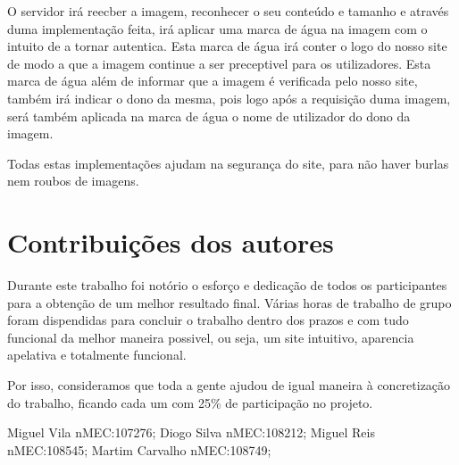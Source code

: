 \documentclass{report}
\begin{document}
O servidor irá reecber a imagem, reconhecer o seu conteúdo e tamanho e através duma implementação feita, irá aplicar uma marca de água na imagem com o intuito de a tornar autentica. Esta marca de água irá conter o logo do nosso site de modo a que a imagem continue a ser preceptivel para os utilizadores.
Esta marca de água além de informar que a imagem é verificada pelo nosso site, também irá indicar o dono da mesma, pois logo após a requisição duma imagem, será também aplicada na marca de água o nome de utilizador do dono da imagem.

Todas estas implementações ajudam na segurança do site, para não haver burlas nem roubos de imagens.



\section{Contribuições dos autores}
Durante este trabalho foi notório o esforço e dedicação de todos os participantes para a obtenção de um melhor resultado final. Várias horas de trabalho de grupo foram dispendidas para concluir o trabalho dentro dos prazos e com tudo funcional da melhor maneira possivel, ou seja, um site intuitivo, aparencia apelativa e totalmente funcional.

Por isso, consideramos que toda a gente ajudou de igual maneira à concretização do trabalho, ficando cada um com 25\% de participação no projeto.

Miguel Vila nMEC:107276; Diogo Silva nMEC:108212; Miguel Reis nMEC:108545; Martim Carvalho nMEC:108749;
\end{document}
